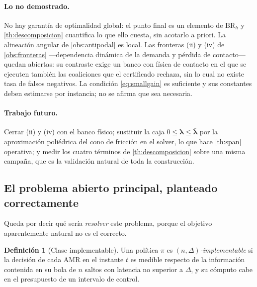 \documentclass[11pt,a4paper]{article}
\theoremstyle{plain}
\theoremstyle{definition}
\newtheorem{definicion}[teorema]{Definición}
\theoremstyle{remark}
\begin{document}
\paragraph{Lo no demostrado.} No hay garantía de optimalidad global: el punto
final es un elemento de $\mathrm{BR}_h$ y \cref{th:descomposicion} cuantifica lo
que ello cuesta, sin acotarlo a priori. La alineación angular de
\cref{obs:antipodal} es local. Las fronteras (ii) y (iv) de
\cref{obs:fronteras} —dependencia dinámica de la demanda y pérdida de
contacto— quedan abiertas: su contraste exige un banco con física de contacto
en el que se ejecuten también las coaliciones que el certificado rechaza, sin
lo cual no existe tasa de falsos negativos. La condición \eqref{eq:smallgain}
es suficiente y sus constantes deben estimarse por instancia; no se afirma que
sea necesaria.

\paragraph{Trabajo futuro.} Cerrar (ii) y (iv) con el banco físico; sustituir la
caja $0\le\bm\lambda\le\bar{\bm\lambda}$ por la aproximación poliédrica del cono
de fricción en el solver, lo que hace \cref{th:span} operativa; y medir los
cuatro términos de \cref{th:descomposicion} sobre una misma campaña, que es la
validación natural de toda la construcción.

\subsection{El problema abierto principal, planteado correctamente}

Queda por decir qué sería \emph{resolver} este problema, porque el objetivo
aparentemente natural no es el correcto.

\begin{definicion}[Clase implementable]
\label{def:implementable}
Una política $\pi$ es $(n,\Delta)$\emph{-implementable} si la decisión de cada
AMR en el instante $t$ es medible respecto de la información contenida en su
bola de $n$ saltos con latencia no superior a $\Delta$, y su cómputo cabe en el
presupuesto de un intervalo de control.
\end{definicion}
\end{document}
